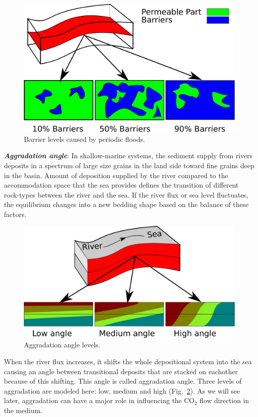 \begin{figure}[thb]
  \centering
  \includegraphics[width=0.65 \linewidth]{./figurer/barrier} 
  \caption{Barrier levels caused by periodic floods.}
  \label{fig:barriers}
%
\end{figure}

\textbf{\textit{Aggradation angle}}:
In shallow-marine systems, the sediment supply from rivers deposits in a
spectrum of large size grains in the land side toward fine grains deep in the
basin. Amount of deposition supplied by the river compared to the accommodation
space that the sea provides defines the transition of different rock-types
between the river and the sea. If the river flux or sea level
fluctuates, the equilibrium changes into a new bedding shape based on the
balance of these
factors.

\begin{figure}[thb]
  \centering
  \includegraphics[width=0.65 \linewidth]{./figurer/agr} 
  \caption{Aggradation angle levels.}
  \label{fig:agrLvl}
%
\end{figure}

When the river flux increases, it shifts the whole depositional system into the
sea causing an  angle between transitional deposits that are stacked on
eachother because of this shifting. This angle is called aggradation angle.
Three levels of aggradation are modeled here: low, medium and
high (Fig.~\ref{fig:agrLvl}). As we will see later, aggradation can have a major
role in influencing the $\mbox{CO}_2$ flow direction in the medium. 

